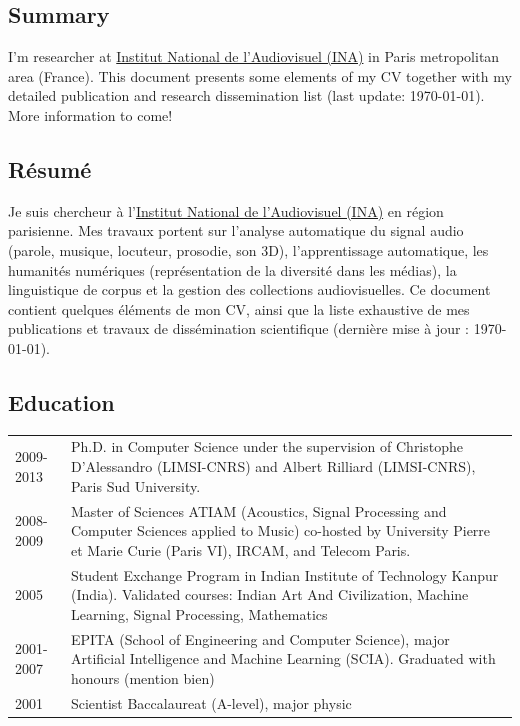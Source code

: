 \begin{en}
\section*{Summary}

I'm researcher at \href{https://www.ina.fr}{Institut National de l'Audiovisuel (INA)} in Paris metropolitan area (France).
This document presents some elements of my CV together with my detailed publication and research dissemination list (last update: \today).
More information to come!
\end{en}

\begin{fr}
\section*{Résumé}

Je suis chercheur à l'\href{https://www.ina.fr}{Institut National de l'Audiovisuel (INA)} en région parisienne.
Mes travaux portent sur l'analyse automatique du signal audio (parole, musique, locuteur, prosodie, son 3D), l'apprentissage automatique, les humanités numériques (représentation de la diversité dans les médias), la linguistique de corpus et la gestion des collections audiovisuelles.
Ce document contient quelques éléments de mon CV, ainsi que la liste exhaustive de mes publications et travaux de dissémination scientifique (dernière mise à jour : \today).
\end{fr}



\tableofcontents

\pagebreak

\begin{en}
\section{Education}
\begin{tabularx}{\linewidth}{@{}l X@{}}	
2009-2013 & Ph.D. in Computer Science under the supervision of Christophe D’Alessandro (LIMSI-CNRS) and Albert Rilliard (LIMSI-CNRS), Paris Sud University.\\
2008-2009 & Master of Sciences ATIAM (Acoustics, Signal Processing and Computer Sciences applied to Music) co-hosted by University Pierre et Marie Curie (Paris VI), IRCAM, and Telecom Paris.\\
2005 & Student Exchange Program in Indian Institute of Technology Kanpur (India). Validated courses: Indian Art And Civilization, Machine Learning, Signal Processing, Mathematics\\
2001-2007 & EPITA (School of Engineering and Computer Science), major Artificial Intelligence and Machine Learning (SCIA). Graduated with honours (mention bien)\\
2001 & Scientist Baccalaureat (A-level), major physic\\
\end{tabularx}
\end{en}


